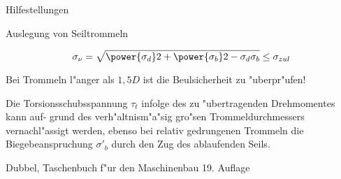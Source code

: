 \documentclass[a4paper]{omdoc}
\begin{document}
\begin{appendix}
\begin{omgroup}{Hilfestellungen}
\begin{omgroup}{Auslegung von Seiltrommeln}
\begin{omtext}
\[\sigma_\nu=\sqrt{\power{\sigma_d}2+\power{\sigma_b}2 - \sigma_d\sigma_b}\leq\sigma_{zul}\]

Bei Trommeln l"anger als $1,5D$ ist die Beulsicherheit zu "uberpr"ufen!
\end{omtext}

\begin{omtext}
  Die Torsionsschubsspannung $\tau_t$ infolge des zu "ubertragenden Drehmomentes kann auf-
  grund des verh"altnism"a"sig gro"sen Trommeldurchmessers vernachl"assigt werden, ebenso
  bei relativ gedrungenen Trommeln die Biegebeanspruchung $\sigma'_b$ durch den Zug des
  ablaufenden Seils.
\end{omtext}

\begin{omtext}[title=Quelle]
  Dubbel, Taschenbuch f"ur den Maschinenbau 19. Auflage
\end{omtext}
\end{omgroup}
\end{omgroup}
\end{appendix}
\end{document}
